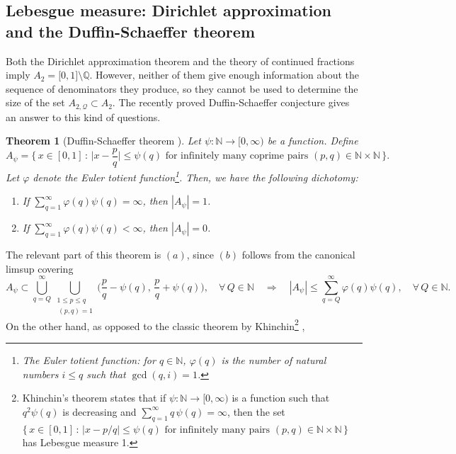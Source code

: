 \documentclass[11pt,reqno]{amsart}
\newtheorem{thm}{Theorem}[section]
\theoremstyle{definition}
\begin{document}
\subsection{Lebesgue measure: Dirichlet approximation and the Duffin-Schaeffer theorem}

Both the Dirichlet approximation theorem 
and the theory of continued fractions
imply $A_2 = \mathbb [0,1] \setminus \mathbb Q$.
However, neither of them give enough information about the sequence of denominators they produce, 
so they cannot be used to determine the size of the set $A_{2,\mathcal Q  }  \subset A_2$.
The recently proved Duffin-Schaeffer conjecture gives an answer to this kind of questions. 
\begin{thm}[Duffin-Schaeffer theorem \cite{KoukoulopoulosMaynard2020}]\label{thm:Duffin_Schaeffer}
Let $\psi: \mathbb N \to [0,\infty)$ be a function. Define
\begin{equation}
A_{\psi}
= \Big\{ \, x \in [0,1] \, : \, \Big| x - \frac{p}{q} \Big| \leq \psi(q) \text{ for infinitely many coprime pairs } (p,q) \in \mathbb N \times \mathbb N  \,   \Big\}.
\end{equation}
Let $\varphi$ denote the Euler totient function\footnote{The Euler totient function:  for $q \in \mathbb N$, $\varphi(q)$ is the number of natural numbers $ i \leq q$ such that $\operatorname{gcd}(q,i)=1$.}. 
Then, we have the following dichotomy: 
\begin{enumerate}
	\item If $\sum_{q = 1}^\infty \varphi(q) \psi(q) = \infty$, then $|A_\psi| = 1$.  
	
	\item If $\sum_{q = 1}^\infty \varphi(q) \psi(q) < \infty$, then $|A_\psi| = 0$.
\end{enumerate}
\end{thm}
The relevant part of this theorem is $(a)$, since $(b)$ follows from the canonical limsup covering 
\begin{equation}\label{eq:Canonical_Cover_Limsup}
A_\psi \subset  \bigcup_{ q = Q }^\infty  \bigcup_{\substack{ 1 \leq p  \leq q \\ \, (p,q) = 1 }} \Big( \frac{p}{q} - \psi(q), \, \frac{p}{q} + \psi(q) \Big), \quad \forall \,  Q \in \mathbb N
\quad \Longrightarrow \quad 
|A_\psi| \leq \sum_{q = Q}^\infty \varphi(q) \psi(q), \quad \forall \, Q \in \mathbb N. 
\end{equation}
On the other hand, 
as opposed to the classic theorem by Khinchin\footnote{Khinchin's theorem states that if $\psi: \mathbb N \to [0,\infty)$ is a function such that $q^2\psi(q)$ is decreasing and $\sum_{q=1}^\infty q\,\psi(q) = \infty$, then the set $\{ \, x \in [0,1] \, : \, |x - p/q| \leq \psi(q) \text{ for infinitely many pairs } (p,q) \in \mathbb N \times \mathbb N \,  \}$ has Lebesgue measure 1. } \cite[Theorem 32]{Khinchin1964},
\end{document}
